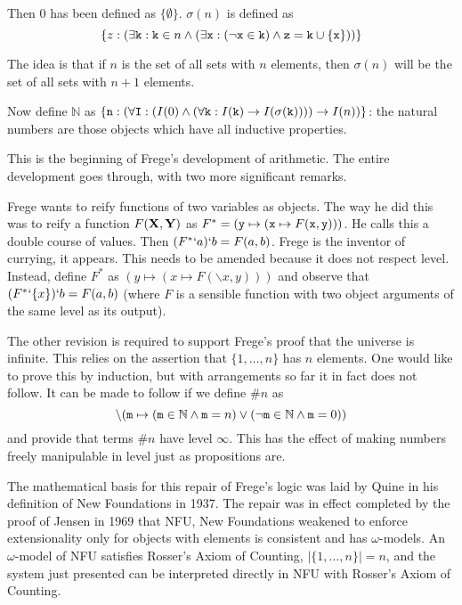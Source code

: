 \documentclass[12pt]{article}
\begin{document}
Then 0 has been defined as $\{\emptyset\}$.  $\sigma(n)$ is defined as $$\{z : (\exists {\tt k}:{\tt k} \in n \wedge (\exists {\tt x}: (\neg {\tt x} \in {\tt k}) \wedge {\tt z} = {\tt k} \cup \{{\tt x}\}))\}$$

The idea is that if $n$ is the set of all sets with $n$ elements, then $\sigma(n)$ will be the set of all sets with $n+1$ elements.

Now define $\mathbb N$ as $\{{\tt n}:(\forall {\tt I}:(I(0) \wedge (\forall {\tt k}:I({\tt k}) \rightarrow I(\sigma({\tt k}))))\rightarrow I(n))\}$:  the natural numbers are those objects which have all inductive properties.

This is the beginning of Frege's development of arithmetic. The entire development goes through, with two more significant remarks.

Frege wants to reify functions of two variables as objects.  The way he did this was to reify a function $F({\bf X},{\bf Y})$ as $F^* =({\tt y} \mapsto ({\tt x} \mapsto F({\tt x},{\tt y})))$.  He calls this a double course of values.  Then $(F^*`a)`b = F(a,b)$.  Frege is the inventor of currying, it appears.  This needs to be amended because it does not respect level.
  Instead, define $F^*$ as $(y \mapsto(x \mapsto F(\backslash x,y)))$ and observe that $(F^*`\{x\})`b = F(a,b)$ (where $F$ is a sensible function with two object arguments of the same level as its output).

The other revision is required to support Frege's proof that the universe is infinite.  This relies on the assertion that $\{1,\ldots,n\}$ has $n$ elements.  One would like to prove this by induction, but with arrangements so far it in fact does not follow.  It can be made to follow if we define $\#n$ as $$\backslash({\tt m} \mapsto ({\tt m} \in {\mathbb N} \wedge {\tt m}=n) \vee (\neg{\tt m} \in {\mathbb N} \wedge {\tt m}=0))$$  and provide that
terms $\#n$ have level $\infty$.  This has the effect of making numbers freely manipulable in level just as propositions are.

The mathematical basis for this repair of Frege's logic was laid by Quine in his definition of New Foundations in 1937.  The repair was in effect completed by the proof of Jensen in 1969 that NFU, New Foundations weakened to enforce extensionality only for objects with elements is consistent and has $\omega$-models.  An $\omega$-model of NFU satisfies Rosser's Axiom of Counting, $|\{1,\ldots,n\}| = n$, and the system just
presented can be interpreted directly in NFU with Rosser's Axiom of Counting.
\end{document}
